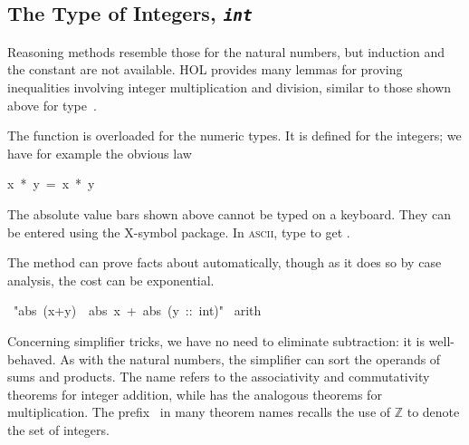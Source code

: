\subsection{The Type of Integers, {\tt\slshape int}}

%
Reasoning methods resemble those for the natural numbers, but induction and
the constant  are not available.  HOL provides many lemmas
for proving inequalities involving integer multiplication and division,
similar to those shown above for type~.  

The  function  is overloaded for the numeric types.
It is defined for the integers; we have for example the obvious law
\begin{isabelle}
\isasymbar x\ *\ y\isasymbar \ =\ \isasymbar x\isasymbar \ *\ \isasymbar y\isasymbar 
{}
\end{isabelle}

\begin{warn}
The absolute value bars shown above cannot be typed on a keyboard.  They
can be entered using the X-symbol package.  In \textsc{ascii}, type  to
get .
\end{warn}

The  method can prove facts about  automatically, 
though as it does so by case analysis, the cost can be exponential.
\begin{isabelle}
\ "abs\ (x+y)\ \isasymle \ abs\ x\ +\ abs\ (y\ ::\ int)"\isanewline
{}\ arith
\end{isabelle}

Concerning simplifier tricks, we have no need to eliminate subtraction: it
is well-behaved.  As with the natural numbers, the simplifier can sort the
operands of sums and products.  The name 
refers to the
associativity and commutativity theorems for integer addition, while
has the analogous theorems for multiplication.  The
prefix~ in many theorem names recalls the use of $\mathbb{Z}$ to
denote the set of integers.

